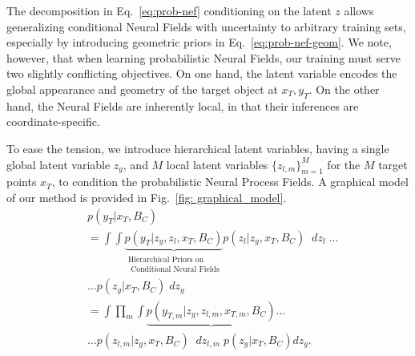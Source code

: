 The decomposition in Eq.~\eqref{eq:prob-nef} conditioning on the latent $z$ allows generalizing conditional Neural Fields with uncertainty to arbitrary training sets, especially by introducing geometric priors in Eq.~\eqref{eq:prob-nef-geom}.
We note, however, that when learning probabilistic Neural Fields, our training must serve two slightly conflicting objectives.
On one hand, the latent variable encodes the global appearance and geometry of the target object at $x_T, y_T$.
On the other hand, the Neural Fields are inherently local, in that their inferences are coordinate-specific.

To ease the tension, we introduce hierarchical latent variables, having a single global latent variable $z_g$, and $M$ local latent variables $\{z_{l,m}\}_{m=1}^M$ for the $M$ target points $x_T$, to condition the probabilistic Neural Process Fields. A graphical model of our method is provided in Fig.~\ref{fig: graphical_model}.
%
\vspace{-1mm}
\begin{align}
&p(y_T | x_T, B_C)  \nonumber \\
&= \int  \int \underbrace{p(y_T | z_g, z_l, x_T, B_C)}_{\substack{\text{Hierarchical Priors on} \\ \text{ Conditional Neural Fields}}}  \nonumber  p(z_l | z_g, x_T, B_C) \;\; d z_l \; \dots \\
&\dots p(z_g | x_T, B_C) \; d z_g \label{eq:prob-nef-hier-1} \\
&= \int \prod_m \int \underbrace{p(y_{T, m} | z_g, z_{l, m}, x_{T, m}, B_C)} \dots \nonumber  \\
&\dots p(z_{l, m} | z_g, x_T, B_C) \;\; d z_{l, m} \; p(z_g | x_T, B_C) d z_g. \label{eq:prob-nef-hier-2}
\end{align}

